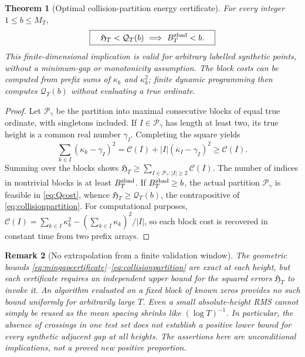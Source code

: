 \documentclass[11pt,reqno]{amsart}
\numberwithin{equation}{section}
\newtheorem{theorem}{Theorem}[section]
\newtheorem{remark}[theorem]{Remark}
\begin{document}
\begin{theorem}[Optimal collision-partition energy certificate]
\label{thm:collisionpartition}
For every integer $1\le b\le M_T$,
\begin{equation}\label{eq:collisionpartition}
 \boxed{\quad \mathfrak H_T<\mathcal Q_T(b)
 \ \Longrightarrow\ B_T^{\rm zbad}<b.\quad}
\end{equation}
This finite-dimensional implication is valid for arbitrary labelled
synthetic points, without a minimum-gap or monotonicity assumption.
The block costs can be computed from prefix sums of $\kappa_k$ and
$\kappa_k^2$; finite dynamic programming then computes
$\mathcal Q_T(b)$ without evaluating a true ordinate.
\end{theorem}
\begin{proof}
Let $\mathcal P_\gamma$ be the partition into maximal consecutive
blocks of equal true ordinate, with singletons included.  If
$I\in\mathcal P_\gamma$ has length at least two, its true height
is a common real number $\gamma_I$. Completing the square yields
\[
 \sum_{k\in I}(\kappa_k-\gamma_I)^2
 =\mathcal C(I)+|I|(\overline\kappa_I-\gamma_I)^2
 \ge\mathcal C(I).
\]
Summing over the blocks shows
$\mathfrak H_T\ge\sum_{I\in\mathcal P_\gamma:|I|\ge2}\mathcal C(I)$.
The number of indices in nontrivial blocks is at least $B_T^{\rm zbad}$.
If $B_T^{\rm zbad}\ge b$, the actual partition $\mathcal P_\gamma$
is feasible in \eqref{eq:Qcost}, whence
$\mathfrak H_T\ge\mathcal Q_T(b)$, the contrapositive of
\eqref{eq:collisionpartition}.  For computational purposes,
\(\mathcal C(I)=\sum_{k\in I}\kappa_k^2-
 (\sum_{k\in I}\kappa_k)^2/|I|\),
so each block cost is recovered in constant time from two prefix arrays.
\end{proof}

\begin{remark}[No extrapolation from a finite validation window]
\label{rem:finitegeometric}
The geometric bounds \eqref{eq:mingapcertificate}--\eqref{eq:collisionpartition}
are exact at each height, but each certificate requires an
\emph{independent} upper bound for the squared errors $\mathfrak H_T$
to invoke it.  An algorithm evaluated on a fixed block of known zeros
provides no such bound uniformly for arbitrarily large $T$.  Even a
small absolute-height RMS cannot simply be reused as the mean spacing
shrinks like $(\log T)^{-1}$.  In particular, the absence of crossings
in one test set does not establish a positive lower bound for every
synthetic adjacent gap at all heights.  The assertions here are
unconditional \emph{implications}, not a proved new positive proportion.
\end{remark}
\end{document}
